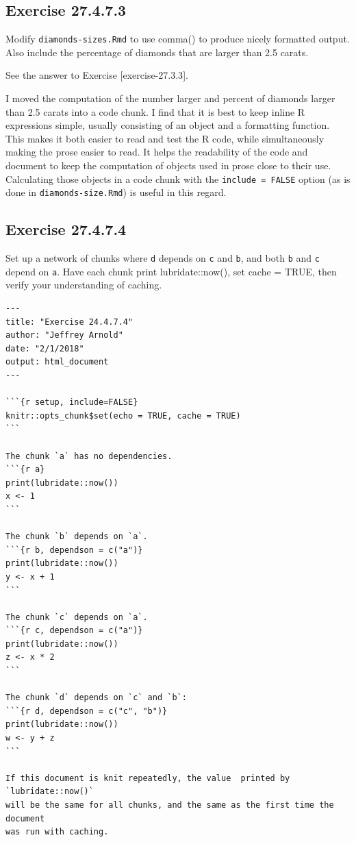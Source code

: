 \documentclass[]{book}
\theoremstyle{plain}
\theoremstyle{remark}
\begin{document}
\hypertarget{exercise-27.4.7.3}{%
\subsection*{\texorpdfstring{Exercise {27.4.7.3}}{Exercise 27.4.7.3}}\label{exercise-27.4.7.3}}

Modify \texttt{diamonds-sizes.Rmd} to use comma() to produce nicely formatted output. Also include the percentage of diamonds that are larger than 2.5 carats.

See the answer to Exercise {[}exercise-27.3.3{]}.

I moved the computation of the number larger and percent of diamonds larger than 2.5 carats into a code chunk.
I find that it is best to keep inline R expressions simple, usually consisting of an object and a formatting function.
This makes it both easier to read and test the R code, while simultaneously making the prose easier to read.
It helps the readability of the code and document to keep the computation of objects used in prose close to their use.
Calculating those objects in a code chunk with the \texttt{include\ =\ FALSE} option (as is done in \texttt{diamonds-size.Rmd}) is useful in this regard.

\hypertarget{exercise-27.4.7.4}{%
\subsection*{\texorpdfstring{Exercise {27.4.7.4}}{Exercise 27.4.7.4}}\label{exercise-27.4.7.4}}

Set up a network of chunks where \texttt{d} depends on \texttt{c} and \texttt{b}, and both \texttt{b} and \texttt{c} depend on \texttt{a}. Have each chunk print lubridate::now(), set cache = TRUE, then verify your understanding of caching.

\begin{verbatim}
---
title: "Exercise 24.4.7.4"
author: "Jeffrey Arnold"
date: "2/1/2018"
output: html_document
---

```{r setup, include=FALSE}
knitr::opts_chunk$set(echo = TRUE, cache = TRUE)
```

The chunk `a` has no dependencies.
```{r a}
print(lubridate::now())
x <- 1
```

The chunk `b` depends on `a`.
```{r b, dependson = c("a")}
print(lubridate::now())
y <- x + 1
```

The chunk `c` depends on `a`.
```{r c, dependson = c("a")}
print(lubridate::now())
z <- x * 2
```

The chunk `d` depends on `c` and `b`:
```{r d, dependson = c("c", "b")}
print(lubridate::now())
w <- y + z
```

If this document is knit repeatedly, the value  printed by `lubridate::now()` 
will be the same for all chunks, and the same as the first time the document
was run with caching.
\end{verbatim}
\end{document}
